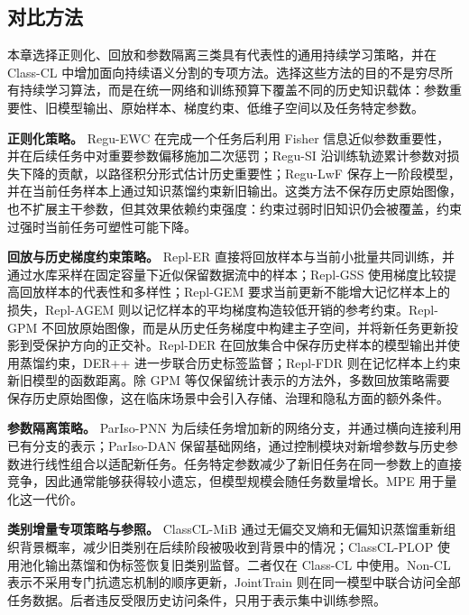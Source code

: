 \subsection*{对比方法}

本章选择正则化、回放和参数隔离三类具有代表性的通用持续学习策略，并在 Class-CL 中增加面向持续语义分割的专项方法。选择这些方法的目的不是穷尽所有持续学习算法，而是在统一网络和训练预算下覆盖不同的历史知识载体：参数重要性、旧模型输出、原始样本、梯度约束、低维子空间以及任务特定参数。

\textbf{正则化策略。} Regu-EWC 在完成一个任务后利用 Fisher 信息近似参数重要性，并在后续任务中对重要参数偏移施加二次惩罚；Regu-SI 沿训练轨迹累计参数对损失下降的贡献，以路径积分形式估计历史重要性；Regu-LwF 保存上一阶段模型，并在当前任务样本上通过知识蒸馏约束新旧输出\cite{kirkpatrick2017ewc,method_regu_si,li2018lwf}。这类方法不保存历史原始图像，也不扩展主干参数，但其效果依赖约束强度：约束过弱时旧知识仍会被覆盖，约束过强时当前任务可塑性可能下降。

\textbf{回放与历史梯度约束策略。} Repl-ER 直接将回放样本与当前小批量共同训练，并通过水库采样在固定容量下近似保留数据流中的样本；Repl-GSS 使用梯度比较提高回放样本的代表性和多样性；Repl-GEM 要求当前更新不能增大记忆样本上的损失，Repl-AGEM 则以记忆样本的平均梯度构造较低开销的参考约束\cite{method_replay_er,method_replay_gss,method_replay_gem,method_replay_agem}。Repl-GPM 不回放原始图像，而是从历史任务梯度中构建主子空间，并将新任务更新投影到受保护方向的正交补\cite{saha2021gpm}。Repl-DER 在回放集合中保存历史样本的模型输出并使用蒸馏约束，DER++ 进一步联合历史标签监督；Repl-FDR 则在记忆样本上约束新旧模型的函数距离\cite{method_replay_der,method_replay_xder,method_replay_fdr}。除 GPM 等仅保留统计表示的方法外，多数回放策略需要保存历史原始图像，这在临床场景中会引入存储、治理和隐私方面的额外条件。

\textbf{参数隔离策略。} ParIso-PNN 为后续任务增加新的网络分支，并通过横向连接利用已有分支的表示；ParIso-DAN 保留基础网络，通过控制模块对新增参数与历史参数进行线性组合以适配新任务\cite{method_dyn_pnn,method_dyn_dan}。任务特定参数减少了新旧任务在同一参数上的直接竞争，因此通常能够获得较小遗忘，但模型规模会随任务数量增长。MPE 用于量化这一代价。

\textbf{类别增量专项策略与参照。} ClassCL-MiB 通过无偏交叉熵和无偏知识蒸馏重新组织背景概率，减少旧类别在后续阶段被吸收到背景中的情况；ClassCL-PLOP 使用池化输出蒸馏和伪标签恢复旧类别监督\cite{cermelli2020mib,douillard2021plop}。二者仅在 Class-CL 中使用。Non-CL 表示不采用专门抗遗忘机制的顺序更新，JointTrain 则在同一模型中联合访问全部任务数据。后者违反受限历史访问条件，只用于表示集中训练参照。


